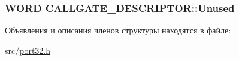 \hypertarget{struct_c_a_l_l_g_a_t_e___d_e_s_c_r_i_p_t_o_r_a438daced95d18f4cd40400fe329e9703}{
\subsubsection[{Unused}]{\setlength{\rightskip}{0pt plus 5cm}W\-O\-R\-D C\-A\-L\-L\-G\-A\-T\-E\-\_\-\-D\-E\-S\-C\-R\-I\-P\-T\-O\-R\-::\-Unused}}\label{struct_c_a_l_l_g_a_t_e___d_e_s_c_r_i_p_t_o_r_a438daced95d18f4cd40400fe329e9703}


Объявления и описания членов структуры находятся в файле\-:\begin{DoxyCompactItemize}
\item 
src/\hyperlink{port32_8h}{port32.\-h}\end{DoxyCompactItemize}
